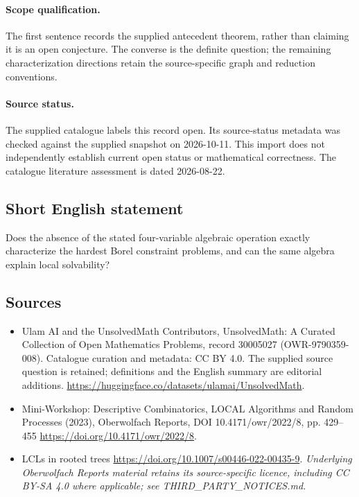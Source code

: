 \documentclass[11pt]{article}
\begin{document}
\paragraph{Scope qualification.}
The first sentence records the supplied antecedent theorem, rather than claiming it is an open conjecture. The converse is the definite question; the remaining characterization directions retain the source-specific graph and reduction conventions.
\paragraph{Source status.}
The supplied catalogue labels this record open. Its source-status metadata was checked against the supplied snapshot on 2026-10-11. This import does not independently establish current open status or mathematical correctness. The catalogue literature assessment is dated 2026-08-22.
\subsection{Short English statement}
Does the absence of the stated four-variable algebraic operation exactly characterize the hardest Borel constraint problems, and can the same algebra explain local solvability?
\subsection{Sources}
\begin{itemize}
\item[S1] Ulam AI and the UnsolvedMath Contributors, UnsolvedMath: A Curated Collection of Open Mathematics Problems, record 30005027 (OWR-9790359-008). Catalogue curation and metadata: CC BY 4.0. The supplied source question is retained; definitions and the English summary are editorial additions.
\url{https://huggingface.co/datasets/ulamai/UnsolvedMath}.
\item[S2] Mini-Workshop: Descriptive Combinatorics, LOCAL Algorithms and Random Processes (2023), Oberwolfach Reports, DOI 10.4171/owr/2022/8, pp. 429--455
\url{https://doi.org/10.4171/owr/2022/8}.
\item[S3] LCLs in rooted trees
\url{https://doi.org/10.1007/s00446-022-00435-9}.
\textit{Underlying Oberwolfach Reports material retains its source-specific licence, including CC BY-SA 4.0 where applicable; see THIRD\_PARTY\_NOTICES.md.}
\end{itemize}
\end{document}
